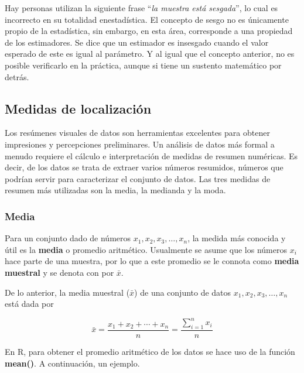 \documentclass[
]{book}
\begin{document}
Hay personas utilizan la siguiente frase ``\emph{la muestra está sesgada}'', lo cual es incorrecto en su totalidad enestadística. El concepto de sesgo no es únicamente propio de la estadística, sin embargo, en esta área, corresponde a una propiedad de los estimadores. Se dice que un estimador es insesgado cuando el valor esperado de este es igual al parámetro. Y al igual que el concepto anterior, no es posible verificarlo en la práctica, aunque si tiene un sustento matemático por detrás.

\hypertarget{medidas-de-localizaciuxf3n}{%
\subsection{Medidas de localización}\label{medidas-de-localizaciuxf3n}}

Los resúmenes visuales de datos son herramientas excelentes para obtener impresiones y percepciones preliminares. Un análisis de datos más formal a menudo requiere el cálculo e interpretación de medidas de resumen numéricas. Es decir, de los datos se trata de extraer varios números resumidos, números que podrían servir para caracterizar el conjunto de datos. Las tres medidas de resumen más utilizadas son la media, la medianda y la moda.

\hypertarget{media}{%
\subsubsection*{Media}\label{media}}

Para un conjunto dado de números \(x_1, x_2, x_3, \ldots, x_n\), la medida más conocida y útil es la \textbf{media} o promedio aritmético. Usualmente se asume que los números \(x_i\) hace parte de una muestra, por lo que a este promedio se le connota como \textbf{media muestral} y se denota con por \(\bar{x}\).

De lo anterior, la media muestral (\(\bar{x}\)) de una conjunto de datos \(x_1, x_2, x_3, \ldots, x_n\) está dada por \citep[página 25]{Devore}

\begin{equation}
\bar{x} = \frac{x_1 + x_2 + \cdots + x_n}{n} = \frac{\displaystyle\sum_{i=1}^{n}x_i}{n}
\label{eq:promedio}
\end{equation}

En R, para obtener el promedio aritmético de los datos se hace uso de la función \textbf{mean()}. A continuación, un ejemplo.
\end{document}

